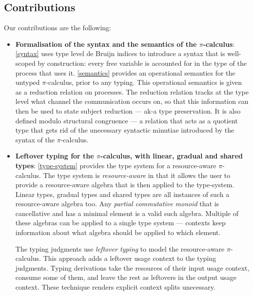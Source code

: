 \documentclass[a4paper,UKenglish,cleveref, autoref, thm-restate,authorcolumns]{lipics-v2019}
\theoremstyle{definition}
\newcommand{\picalc}{$\pi$-calculus}
\begin{document}
\subsection{Contributions}
Our contributions are the following:
\begin{itemize}
\item \textbf{Formalisation of the syntax and the semantics of the \picalc{}}:
  \autoref{syntax} uses type level de Bruijn indices \cite{deBruijn1972} to introduce a syntax that is well-scoped by construction: every free variable is accounted for in the type of the process that uses it.
  \autoref{semantics} provides an operational semantics for the untyped \picalc{}, prior to any typing.
  This operational semantics is given as a reduction relation on processes.
  The reduction relation tracks at the type level what channel the communication occurs on, so that this information can then be used to state subject reduction --- ak-a type preservation.
  It is also defined modulo structural congruence --- a relation that acts as a quotient type that gets rid of the unecessary syntactic minutiae introduced by the syntax of the \picalc{}.

  \item \textbf{Leftover typing for the \picalc{}, with linear, gradual and shared types}:
  \autoref{type-system} provides the type system for a resource-aware \picalc{}.
  The type system is \emph{resource-aware} in that it allows the user to provide a resource-aware algebra that is then applied to the type-system.
  Linear types, gradual types and shared types are all instances of such a resource-aware algebra too.
  Any \emph{partial commutative monoid} that is cancellative and has a minimal element is a valid such algebra.
  Multiple of these algebras can be applied to a single type system --- contexts keep information about what algebra should be applied to which element.

  The typing judgments use \emph{leftover typing} to model the resource-aware \picalc{}.
  This approach adds a leftover usage context to the typing judgments.
  Typing derivations take the resources of their input usage context, consume some of them, and leave the rest as leftovers in the output usage context.
  These technique renders explicit context splits unecessary.


\end{itemize}
\end{document}
